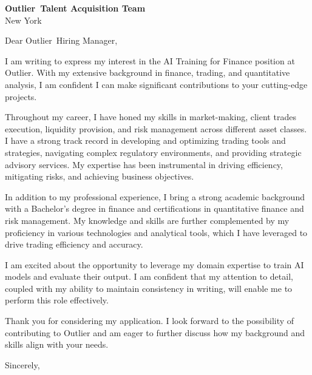\documentclass{letter}
\newcommand{\company}{Outlier}
\begin{document}
\begin{letter}{\textbf{\company\ Talent Acquisition Team} \\                
                New York }

\opening{Dear \company\ Hiring Manager,}

I am writing to express my interest in the AI Training for Finance position at Outlier. With my extensive background in finance, trading, and quantitative analysis, I am confident I can make significant contributions to your cutting-edge projects.

Throughout my career, I have honed my skills in market-making, client trades execution, liquidity provision, and risk management across different asset classes. I have a strong track record in developing and optimizing trading tools and strategies, navigating complex regulatory environments, and providing strategic advisory services. My expertise has been instrumental in driving efficiency, mitigating risks, and achieving business objectives.

In addition to my professional experience, I bring a strong academic background with a Bachelor's degree in finance and certifications in quantitative finance and risk management. My knowledge and skills are further complemented by my proficiency in various technologies and analytical tools, which I have leveraged to drive trading efficiency and accuracy.

I am excited about the opportunity to leverage my domain expertise to train AI models and evaluate their output. I am confident that my attention to detail, coupled with my ability to maintain consistency in writing, will enable me to perform this role effectively.

Thank you for considering my application. I look forward to the possibility of contributing to Outlier and am eager to further discuss how my background and skills align with your needs.



\closing{Sincerely,}

\end{letter}
\end{document}

